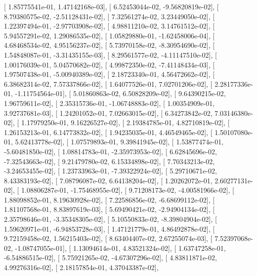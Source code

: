 \documentclass{article}
\begin{document}
       [  1.85775541e-01,   1.47142168e-03],
       [  6.52453044e-02,  -9.56820819e-02],
       [  8.79380575e-02,  -2.51128431e-02],
       [  7.32561274e-02,   3.23449050e-02],
       [  1.22397494e-01,  -2.97703908e-02],
       [  4.98811210e-02,   3.14761512e-02],
       [  5.94557291e-02,   1.29086535e-02],
       [  1.05829880e-01,  -1.62458006e-04],
       [  4.68468534e-02,   4.95156237e-02],
       [  5.73970158e-02,  -8.30954690e-02],
       [  1.54848087e-01,  -3.31435155e-03],
       [  8.29561577e-02,  -4.11147510e-02],
       [  1.00176039e-01,   5.04570682e-02],
       [  4.99872350e-02,  -7.41148434e-03],
       [  1.97507438e-01,  -5.00940389e-02],
       [  2.18723340e-01,   4.56472662e-02],
       [  6.38682314e-02,   7.57337866e-02],
       [  1.64077526e-01,   7.02701206e-02],
       [  2.28177336e-01,  -1.11754564e-01],
       [  5.01860863e-02,   6.50828209e-02],
       [  9.64390215e-02,   1.96759611e-02],
       [  2.35315736e-01,  -1.06748883e-02],
       [  1.00354909e-01,   3.92737681e-03],
       [  1.24201052e-01,   7.02663015e-02],
       [  6.34273842e-02,   7.03146380e-02],
       [  1.17979250e-01,   9.16226527e-02],
       [  2.19384785e-01,   4.82710819e-02],
       [  1.26153213e-01,   6.14773832e-02],
       [  1.94235035e-01,   4.46549465e-02],
       [  1.50107080e-01,   5.62413778e-02],
       [  1.07579893e-01,   9.39841945e-02],
       [  1.53877474e-01,  -5.60481850e-02],
       [  1.08814783e-01,  -2.35973953e-02],
       [  6.62845696e-02,  -7.32543663e-02],
       [  9.21479780e-02,   6.15334898e-02],
       [  7.70343213e-02,  -3.24653455e-02],
       [  1.23733963e-01,  -7.39322924e-02],
       [  5.29710671e-02,   8.43383193e-02],
       [  7.08796087e-02,   6.64138204e-02],
       [  1.20262072e-01,   2.60277131e-02],
       [  1.08806287e-01,  -1.75468955e-02],
       [  9.71208173e-02,  -4.00581966e-02],
       [  1.88098852e-01,   8.19630928e-02],
       [  7.22586856e-02,  -6.68699112e-02],
       [  1.81107568e-01,   8.83897619e-03],
       [  5.69490421e-02,  -2.94904134e-02],
       [  2.35798646e-01,  -3.35348305e-02],
       [  5.10550833e-02,  -8.39804904e-02],
       [  1.59620971e-01,  -6.94853728e-03],
       [  1.47121779e-01,   4.86492878e-02],
       [  9.72159458e-02,   1.56215403e-02],
       [  8.63404407e-02,   2.67255074e-03],
       [  7.52397068e-02,  -1.08747055e-01],
       [  1.13094614e-01,   4.83521324e-02],
       [  1.63747258e-01,  -6.54886515e-02],
       [  5.75921265e-02,  -4.67307296e-02],
       [  4.83811871e-02,   4.99276316e-02],
       [  2.18157854e-01,   4.37043387e-02],
\end{document}
